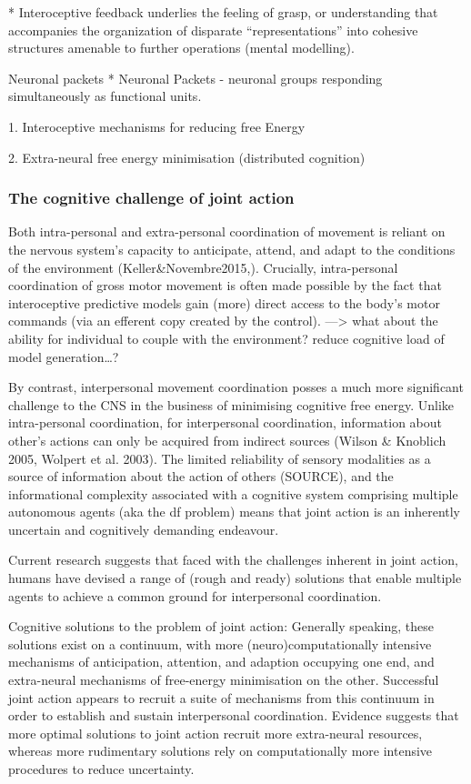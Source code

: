 \begin{CJK}{UTF8}{gbsn}
* Interoceptive feedback underlies the feeling of grasp, or understanding that accompanies the organization of disparate “representations” into cohesive structures amenable to further operations (mental modelling).

Neuronal packets
* Neuronal Packets - neuronal groups responding simultaneously as functional units.



1. Interoceptive mechanisms for reducing free Energy

2. Extra-neural free energy minimisation (distributed cognition)



\subsubsection{The cognitive challenge of joint action}

Both intra-personal and extra-personal coordination of movement is reliant on the nervous system’s capacity to anticipate, attend, and adapt to the conditions of the environment (Keller&Novembre2015,).  Crucially, intra-personal coordination of gross motor movement is often made possible by the fact that interoceptive predictive models gain (more) direct access to the body's motor commands (via an efferent copy created by the control).
—> what about the ability for individual to couple with the environment? reduce cognitive load of model generation…?

By contrast, interpersonal movement coordination posses a much more significant challenge to the CNS in the business of minimising cognitive free energy.  Unlike intra-personal coordination, for interpersonal coordination, information about other’s actions can only be acquired from indirect sources (Wilson & Knoblich 2005, Wolpert et al. 2003).  The limited reliability of sensory modalities as a source of information about the action of others (SOURCE), and the informational complexity associated with a cognitive system comprising multiple autonomous agents (aka the df problem) means that joint action is an inherently uncertain and cognitively demanding endeavour.

Current research suggests that faced with the challenges inherent in joint action,  humans have devised a range of (rough and ready) solutions that enable multiple agents to achieve a common ground for interpersonal coordination.


Cognitive solutions to the problem of joint action:
Generally speaking, these solutions exist on a continuum, with more (neuro)computationally intensive mechanisms of anticipation, attention, and adaption occupying one end, and extra-neural mechanisms of free-energy minimisation on the other.  Successful joint action appears to recruit a suite of mechanisms from this continuum in order to establish and sustain interpersonal coordination.   Evidence suggests that more optimal solutions to joint action recruit more extra-neural resources, whereas more rudimentary solutions rely on computationally more intensive procedures to reduce uncertainty.


\end{CJK}
